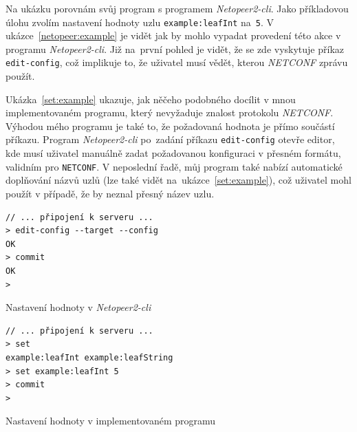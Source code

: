 \documentclass[thesis=B,czech,hidelinks]{FITthesis}[2019/03/06]
\begin{document}
Na ukázku porovnám svůj program s programem \textit{Netopeer2-cli}. Jako příkladovou úlohu zvolím nastavení hodnoty uzlu \texttt{example:leafInt} na~\texttt{5}. V ukázce~\ref{netopeer:example} je vidět jak by mohlo vypadat provedení této akce v programu \textit{Netopeer2-cli}. Již na~první pohled je vidět, že se zde vyskytuje příkaz \texttt{edit-config}, což implikuje to, že uživatel musí vědět, kterou \textit{NETCONF} zprávu použít.

Ukázka~\ref{set:example} ukazuje, jak něčeho podobného docílit v mnou implementovaném programu, který nevyžaduje znalost protokolu \textit{NETCONF}. Výhodou mého programu je také to, že požadovaná hodnota je přímo součástí příkazu. Program \textit{Netopeer2-cli} po~zadání příkazu \texttt{edit-config} otevře editor, kde musí uživatel manuálně zadat požadovanou konfiguraci v přesném formátu, validním pro \texttt{NETCONF}. V neposlední řadě, můj program také nabízí automatické doplňování názvů uzlů (lze také vidět na~ukázce~\ref{set:example}), což uživatel mohl použít v případě, že by neznal přesný název uzlu.
\begin{listing}
\begin{verbatim}
// ... připojení k serveru ...
> edit-config --target --config
OK
> commit
OK
>
\end{verbatim}
\caption{Nastavení hodnoty v \textit{Netopeer2-cli}\label{netopeer:example}}
\end{listing}

\begin{listing}
\begin{verbatim}
// ... připojení k serveru ...
> set
example:leafInt example:leafString
> set example:leafInt 5
> commit
>
\end{verbatim}
\caption{Nastavení hodnoty v implementovaném programu}\label{set:example}
\end{listing}
\end{document}
